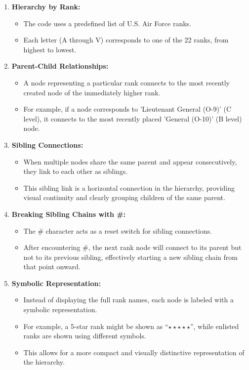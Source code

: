 \begin{enumerate}
    \item \textbf{Hierarchy by Rank:} 
    \begin{itemize}
        \item  The code uses a predefined list of U.S. Air Force ranks.
            
        \item  Each letter (A through V) corresponds to one of the 22 ranks, from highest to lowest.
    \end{itemize}
    \item \textbf{Parent-Child Relationships:} 
    \begin{itemize}
        \item  A node representing a particular rank connects to the most recently created node of the immediately higher rank.
            
        \item  For example, if a node corresponds to 'Lieutenant General (O-9)' (C level), it connects to the most recently placed 'General (O-10)' (B level) node.
    \end{itemize}
    \item \textbf{Sibling Connections:} 
    \begin{itemize}
        \item  When multiple nodes share the same parent and appear consecutively, they link to each other as siblings.
            
        \item  This sibling link is a horizontal connection in the hierarchy, providing visual continuity and clearly grouping children of the same parent.
    \end{itemize}
    \item \textbf{Breaking Sibling Chains with \#:} 
    \begin{itemize}
        \item  The \# character acts as a reset switch for sibling connections.
            
        \item  After encountering \#, the next rank node will connect to its parent but not to its previous sibling, effectively starting a new sibling chain from that point onward.
    \end{itemize}
    \item \textbf{Symbolic Representation:} 
    \begin{itemize}
        \item  Instead of displaying the full rank names, each node is labeled with a symbolic representation.
        
        \item  For example, a 5-star rank might be shown as “$\star\star\star\star\star$”, while enlisted ranks are shown using different symbols.

        \item  This allows for a more compact and visually distinctive representation of the hierarchy.
    \end{itemize}
\end{enumerate}

